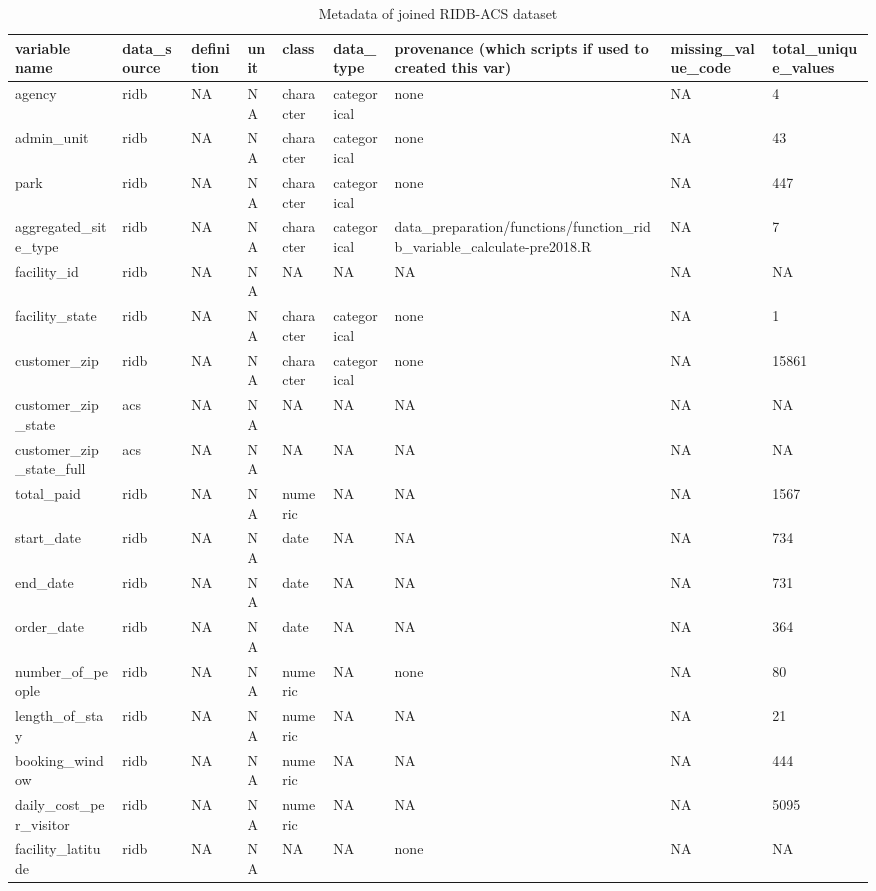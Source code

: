 \documentclass[
]{book}
\begin{document}
\begin{table}

\caption{\label{tab:unnamed-chunk-4}Metadata of joined RIDB-ACS dataset}
\centering
\begin{tabular}[t]{l|l|l|l|l|l|l|l|l}
\hline
variable name & data\_source & definition & unit & class & data\_type & provenance (which scripts if used to created this var) & missing\_value\_code & total\_unique\_values\\
\hline
agency & ridb & NA & NA & character & categorical & none & NA & 4\\
\hline
admin\_unit & ridb & NA & NA & character & categorical & none & NA & 43\\
\hline
park & ridb & NA & NA & character & categorical & none & NA & 447\\
\hline
aggregated\_site\_type & ridb & NA & NA & character & categorical & data\_preparation/functions/function\_ridb\_variable\_calculate-pre2018.R & NA & 7\\
\hline
facility\_id & ridb & NA & NA & NA & NA & NA & NA & NA\\
\hline
facility\_state & ridb & NA & NA & character & categorical & none & NA & 1\\
\hline
customer\_zip & ridb & NA & NA & character & categorical & none & NA & 15861\\
\hline
customer\_zip\_state & acs & NA & NA & NA & NA & NA & NA & NA\\
\hline
customer\_zip\_state\_full & acs & NA & NA & NA & NA & NA & NA & NA\\
\hline
total\_paid & ridb & NA & NA & numeric & NA & NA & NA & 1567\\
\hline
start\_date & ridb & NA & NA & date & NA & NA & NA & 734\\
\hline
end\_date & ridb & NA & NA & date & NA & NA & NA & 731\\
\hline
order\_date & ridb & NA & NA & date & NA & NA & NA & 364\\
\hline
number\_of\_people & ridb & NA & NA & numeric & NA & none & NA & 80\\
\hline
length\_of\_stay & ridb & NA & NA & numeric & NA & NA & NA & 21\\
\hline
booking\_window & ridb & NA & NA & numeric & NA & NA & NA & 444\\
\hline
daily\_cost\_per\_visitor & ridb & NA & NA & numeric & NA & NA & NA & 5095\\
\hline
facility\_latitude & ridb & NA & NA & NA & NA & none & NA & NA\\

\end{tabular}
\end{table}
\end{document}
